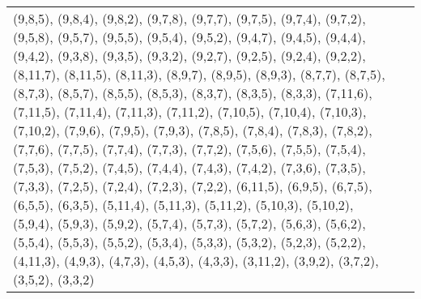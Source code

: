 \documentclass[11pt,a4paper]{article}
\theoremstyle{definition}
\begin{document}
\begin{center}
\begin{table}[p]
\begin{tabular}{p{7.5cm} | p{7.5cm}}
(9,8,5), (9,8,4), (9,8,2), (9,7,8), (9,7,7), (9,7,5), (9,7,4), (9,7,2), (9,5,8), (9,5,7), (9,5,5), (9,5,4), (9,5,2), (9,4,7), (9,4,5), (9,4,4), (9,4,2), (9,3,8), (9,3,5), (9,3,2), (9,2,7), (9,2,5), (9,2,4), (9,2,2), (8,11,7), (8,11,5), (8,11,3), (8,9,7), (8,9,5), (8,9,3), (8,7,7), (8,7,5), (8,7,3), (8,5,7), (8,5,5), (8,5,3), (8,3,7), (8,3,5), (8,3,3), (7,11,6), (7,11,5), (7,11,4), (7,11,3), (7,11,2), (7,10,5), (7,10,4), (7,10,3), (7,10,2), (7,9,6), (7,9,5), (7,9,3), (7,8,5), (7,8,4), (7,8,3), (7,8,2), (7,7,6), (7,7,5), (7,7,4), (7,7,3), (7,7,2), (7,5,6), (7,5,5), (7,5,4), (7,5,3), (7,5,2), (7,4,5), (7,4,4), (7,4,3), (7,4,2), (7,3,6), (7,3,5), (7,3,3), (7,2,5), (7,2,4), (7,2,3), (7,2,2), (6,11,5), (6,9,5), (6,7,5), (6,5,5), (6,3,5), (5,11,4), (5,11,3), (5,11,2), (5,10,3), (5,10,2), (5,9,4), (5,9,3), (5,9,2), (5,7,4), (5,7,3), (5,7,2), (5,6,3), (5,6,2), (5,5,4), (5,5,3), (5,5,2), (5,3,4), (5,3,3), (5,3,2), (5,2,3), (5,2,2), (4,11,3), (4,9,3), (4,7,3), (4,5,3), (4,3,3), (3,11,2), (3,9,2), (3,7,2), (3,5,2), (3,3,2)
\end{tabular}
\end{table}
\end{center}
\end{document}
